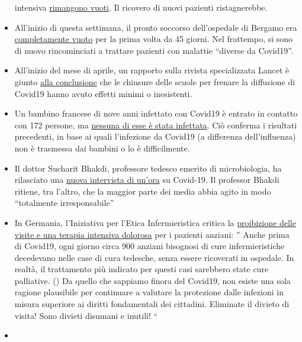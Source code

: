 \begin{itemize}
  intensiva
  \href{https://www.heraldscotland.com/news/18377095.coronavirus-scotland-half-icu-beds-empty/}{rimangono
  vuoti}. Il ricovero di nuovi pazienti ristagnerebbe.
\item
  All'inizio di questa settimana, il pronto soccorso dell'ospedale di
  Bergamo era \href{https://orf.at/stories/3162642/}{completamente
  vuoto} per la prima volta da 45 giorni. Nel frattempo, si sono di
  nuovo rincominciati a trattare pazienti con malattie ``diverse da
  Covid19''.
\item
  All'inizio del mese di aprile, un rapporto sulla rivista specializzata
  Lancet è giunto
  \href{https://www.thelancet.com/journals/lanchi/article/PIIS2352-4642(20)30095-X/fulltext}{alla
  conclusione} che le chiusure delle scuole per frenare la diffusione di
  Covid19 hanno avuto effetti minimi o inesistenti.
\item
  Un bambino francese di nove anni infettato con Covid19 è entrato in
  contatto con 172 persone, ma
  \href{https://www.n-tv.de/panorama/172-Kontaktpersonen-von-Corona-verschont-article21727469.html}{nessuna
  di esse è stata infettata}. Ciò conferma i risultati precedenti, in
  base ai quali l'infezione da Covid19 (a differenza dell'influenza) non
  è trasmessa dai bambini o lo è difficilmente.
\item
  Il dottor Sucharit Bhakdi, professore tedesco emerito di
  microbiologia, ha rilasciato una
  \href{https://kenfm.de/kenfm-am-set-gespraech-mit-prof-dr-sucharit-bhakdi-zu-covid-19/}{nuova
  intervista di un'ora} su Covid-19. Il professor Bhakdi ritiene, tra
  l'altro, che la maggior parte dei media abbia agito in modo
  ``totalmente irresponsabile''
\item
  In Germania, l'Iniziativa per l'Etica Infermieristica critica la
  \href{http://pflegeethik-initiative.de/2020/04/15/corona-krise-falsche-prioritaeten-gesetzt-und-ethische-prinzipien-verletzt/}{proibizione
  delle visite e una terapia intensiva dolorosa} per i pazienti anziani:
  '' Anche prima di Covid19, ogni giorno circa 900 anziani bisognosi di
  cure infermieristiche decedevano nelle case di cura tedesche, senza
  essere ricoverati in ospedale. In realtà, il trattamento più indicato
  per questi casi sarebbero state cure palliative. () Da quello che
  sappiamo finora del Covid19, non esiste una sola ragione plausibile
  per continuare a valutare la protezione dalle infezioni in misura
  superiore ai diritti fondamentali dei cittadini. Eliminate il divieto
  di visita! Sono divieti disumani e inutili! ``
\item

\end{itemize}
